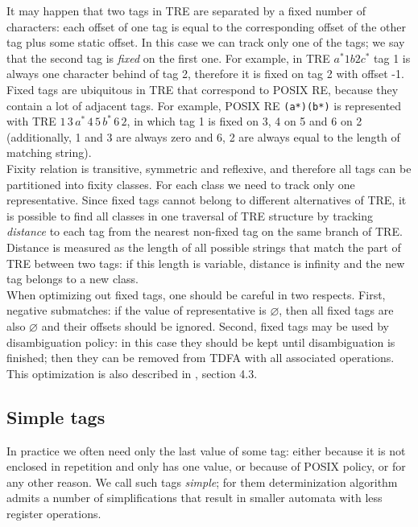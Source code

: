 \documentclass{article}
\theoremstyle{definition}
\begin{document}
\begin{multicols}{2}
It may happen that two tags in TRE are separated by a fixed number of characters:
each offset of one tag is equal to the corresponding offset of the other tag plus some static offset.
In this case we can track only one of the tags; we say that the second tag is \emph{fixed} on the first one.
For example, in TRE $a^* 1 b 2 c^*$ tag 1 is always one character behind of tag 2,
therefore it is fixed on tag 2 with offset -1.
Fixed tags are ubiquitous in TRE that correspond to POSIX RE, because they contain a lot of adjacent tags.
For example, POSIX RE \texttt{(a*)(b*)} is represented with TRE $1 \, 3 \, a^* \, 4 \, 5 \, b^* \, 6 \, 2$,
in which tag 1 is fixed on 3, 4 on 5 and 6 on 2
(additionally, 1 and 3 are always zero and 6, 2 are always equal to the length of matching string).
\\

Fixity relation is transitive, symmetric and reflexive,
and therefore all tags can be partitioned into fixity classes.
For each class we need to track only one representative.
Since fixed tags cannot belong to different alternatives of TRE,
it is possible to find all classes in one traversal of TRE structure
by tracking \emph{distance} to each tag from the nearest non-fixed tag on the same branch of TRE.
Distance is measured as the length of all possible strings that match the part of TRE between two tags:
if this length is variable, distance is infinity and the new tag belongs to a new class.
\\

When optimizing out fixed tags, one should be careful in two respects.
First, negative submatches: if the value of representative is $\varnothing$,
then all fixed tags are also $\varnothing$ and their offsets should be ignored.
Second, fixed tags may be used by disambiguation policy:
in this case they should be kept until disambiguation is finished;
then they can be removed from TDFA with all associated operations.
\\

This optimization is also described in \cite{Lau01}, section 4.3.

\subsection*{Simple tags}

In practice we often need only the last value of some tag:
either because it is not enclosed in repetition and only has one value, or because of POSIX policy, or for any other reason.
We call such tags \emph{simple};
for them determinization algorithm admits a number of simplifications
that result in smaller automata with less register operations.
\\


\end{multicols}
\end{document}
